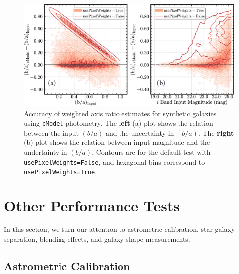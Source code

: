\documentclass[useamsfonts]{pasj01}
\def\cmodel{\texttt{cModel}}
\begin{document}
\begin{figure}
    \begin{center}
        \includegraphics[width=\textwidth]{fig/synpipe_galaxy_ba}
    \end{center}
    \caption{
        Accuracy of weighted axis ratio estimates for synthetic
        galaxies using \cmodel{} photometry.
        The \textbf{left} (a) plot shows the relation between the input $(b/a)$ and 
        the uncertainty in $(b/a)$.
        The \textbf{right} (b) plot shows the relation between input magnitude and 
        the undertainty in $(b/a)$.
        Contours are for the default test with \texttt{usePixelWeights=False}, and 
        hexagonal bins correspond to \texttt{usePixelWeights=True}.
        }
    \label{fig:galaxy_ba}
\end{figure}



\section{Other Performance Tests}
    \label{sec:others}

    In this section, we turn our attention to astrometric calibration, star-galaxy 
    separation, blending effects, and galaxy shape measurements. 

\subsection{Astrometric Calibration}
    \label{ssec:astrometry}
\end{document}
